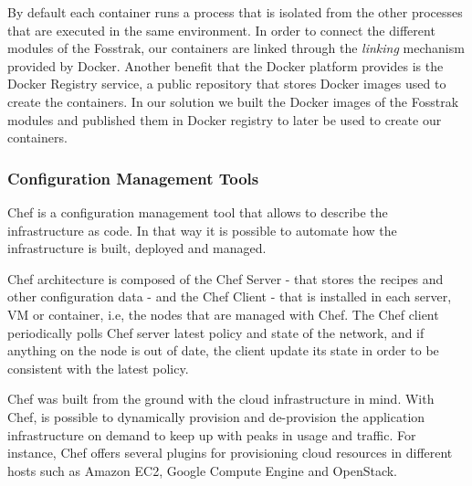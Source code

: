 By default each container runs a process that is isolated from the other processes that are executed in
the same environment. In order to connect the different modules of the Fosstrak, our containers are
linked through the \textit{linking} mechanism provided by Docker. Another benefit that the Docker platform
provides is the Docker Registry service, a public repository that stores Docker images used to create the
containers. In our solution we built the Docker images of the Fosstrak modules and published them
in Docker registry to later be used to create our containers.
\subsubsection{Configuration Management Tools}
\label{subs:cm_tools}
Chef is a configuration management tool that allows to describe the infrastructure as code. In that way
it is possible to automate how the infrastructure is built, deployed and managed.

Chef architecture is composed of the Chef Server - that stores the recipes and other configuration data -
and the  Chef Client - that is installed in each server, VM or container, i.e, the nodes that are managed with Chef.
The Chef client periodically polls Chef server latest policy and state of the network, and if anything on the
node is out of date, the client update its state in order to be consistent with the latest policy.

Chef was built from the ground with the cloud infrastructure in mind. With Chef, is possible to dynamically
provision and de-provision the application infrastructure on demand to keep up with peaks in usage and traffic.
For instance, Chef offers several plugins for provisioning cloud resources in different hosts such as
Amazon EC2, Google Compute Engine and OpenStack.
